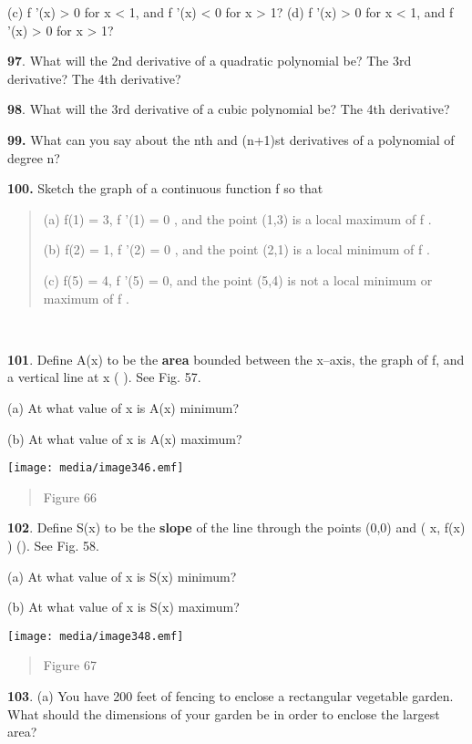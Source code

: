 (c) f '(x) \textgreater{} 0 for x \textless{} 1, and f '(x) \textless{}
0 for x \textgreater{} 1? (d) f '(x) \textgreater{} 0 for x \textless{}
1, and f '(x) \textgreater{} 0 for x \textgreater{} 1?

\textbf{97}. What will the 2nd derivative of a quadratic polynomial be?
The 3rd derivative? The 4th derivative?

\textbf{98}. What will the 3rd derivative of a cubic polynomial be? The
4th derivative?

\textbf{99.} What can you say about the nth and (n+1)st derivatives of a
polynomial of degree n?

\textbf{100.} Sketch the graph of a continuous function f so that

\begin{quote}
(a) f(1) = 3, f '(1) = 0 , and the point (1,3) is a local maximum of f .

(b) f(2) = 1, f '(2) = 0 , and the point (2,1) is a local minimum of f .

(c) f(5) = 4, f '(5) = 0, and the point (5,4) is not a local minimum or
maximum of f .
\end{quote}

\textbf{\\
}

\textbf{101}. Define A(x) to be the \textbf{area} bounded between the
x--axis, the graph of f, and a vertical line at x ( ). See Fig. 57.

(a) At what value of x is A(x) minimum?

(b) At what value of x is A(x) maximum?

\texttt{[image: media/image346.emf]}

\begin{quote}
Figure 66
\end{quote}

\textbf{102}. Define S(x) to be the \textbf{slope} of the line through
the points (0,0) and ( x, f(x) ) (). See Fig. 58.

(a) At what value of x is S(x) minimum?

(b) At what value of x is S(x) maximum?

\texttt{[image: media/image348.emf]}

\begin{quote}
Figure 67
\end{quote}

\textbf{103}. (a) You have 200 feet of fencing to enclose a rectangular
vegetable garden. What should the dimensions of your garden be in order
to enclose the largest area?

